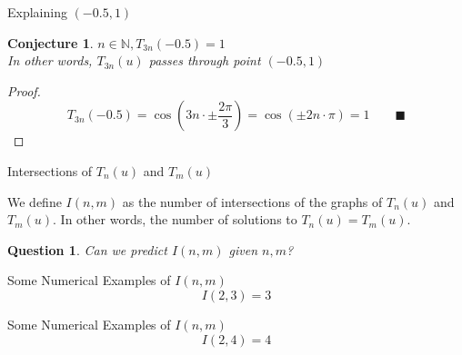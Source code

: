 \documentclass{beamer}
\newtheorem{conjecture}{Conjecture}
\newtheorem{question}{Question}
\begin{document}
\begin{frame}{Explaining $(-0.5,1)$}
 \begin{conjecture}\center
  \vspace{-12pt}
  $n\in\mathbb{N}, T_{3n}(-0.5)=1$ \\
  In other words, $T_{3n}(u)$ passes through point $(-0.5,1)$ \\[12pt]
 \end{conjecture}
 \pause
 \begin{proof}
  \vspace{-12pt}
  \[T_{3n}(-0.5)=\cos\left(3n\cdot \pm \frac{2\pi}{3}\right)=\cos(\pm 2n\cdot \pi)=1\qquad \blacksquare\]
 \end{proof}
\end{frame}

\begin{frame}{Intersections of $T_n(u)$ and $T_m(u)$}
 \begin{definition}
  We define $I(n,m)$ as the number of intersections of the graphs of $T_n(u)$ and $T_m(u)$. In other words, the number of solutions to $T_n(u)=T_m(u)$.
 \end{definition}
 \vspace{24pt}
 \begin{question}
  Can we predict $I(n,m)$ given $n,m$?
 \end{question}
\end{frame}

\begin{frame}{Some Numerical Examples of $I(n,m)$}
 \vspace{-12pt}
 \[I(2,3)=3\]
\end{frame}

\begin{frame}{Some Numerical Examples of $I(n,m)$}
 \vspace{-12pt}
 \[I(2,4)=4\]
\end{frame}
\end{document}
